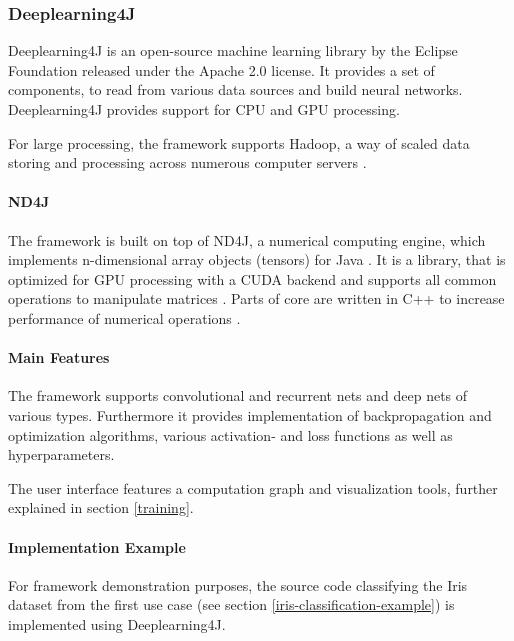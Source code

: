 \subsubsection{Deeplearning4J}\label{deeplearning4j}

Deeplearning4J is an open-source machine learning library by the Eclipse
Foundation released under the Apache 2.0 license. It provides a set of
components, to read from various data sources and build neural networks.
Deeplearning4J provides support for CPU and GPU processing.
\cite{wired-dl4j}

For large processing, the framework supports Hadoop, a way of scaled
data storing and processing across numerous computer servers
\cite{wired-dl4j}.

\paragraph{ND4J}\label{nd4j}

The framework is built on top of ND4J, a numerical computing engine,
which implements n-dimensional array objects (tensors) for Java
\cite{nd4j-intro}. It is a library, that is optimized for GPU processing
with a CUDA backend and supports all common operations to manipulate
matrices \cite{nd4j-intro}. Parts of core are written in C++ to increase
performance of numerical operations \cite{nd4j-benchmarking}.

\paragraph{Main Features}\label{main-features}

The framework supports convolutional and recurrent nets and deep nets of
various types. Furthermore it provides implementation of backpropagation
and optimization algorithms, various activation- and loss functions as
well as hyperparameters. \cite{dl4j-features}

The user interface features a computation graph and visualization tools,
further explained in section \ref{training}.

\paragraph{Implementation Example}\label{implementation-example-1}

For framework demonstration purposes, the source code classifying the
Iris dataset from the first use case (see section
\ref{iris-classification-example}) is implemented using Deeplearning4J.

